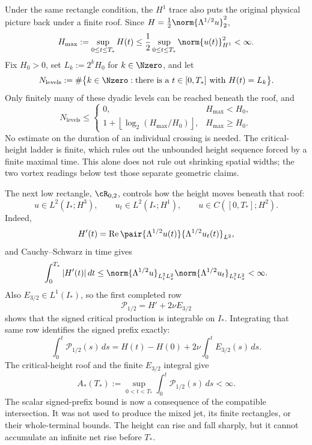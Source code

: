 Under the same rectangle condition, the \(H^1\) trace also puts the original physical
picture back under a finite roof.  Since
\(H=\tfrac12\norm{\Lambda^{1/2}u}_2^2\),
\begin{equation}\label{eq:BodyCriticalHeightRoof}
  H_{\max}
  :=\sup_{0\leq t\leq T_*}H(t)
  \leq\frac12\sup_{0\leq t\leq T_*}\norm{u(t)}_{H^1}^2
  <\infty.
\end{equation}
Fix \(H_0>0\), set \(L_k:=2^kH_0\) for \(k\in\Nzero\), and let
\[
  N_{\mathrm{levels}}
  :=
  \#\bigl\{k\in\Nzero:\text{there is a }t\in[0,T_*]\text{ with }H(t)=L_k\bigr\}.
\]
Only finitely many of these dyadic levels can be reached beneath the roof, and
\begin{equation}\label{eq:BodyFiniteZenoOctaveCount}
  N_{\mathrm{levels}}
  \leq
  \begin{cases}
    0,&H_{\max}<H_0,\\[0.25em]
    1+\left\lfloor\log_2(H_{\max}/H_0)\right\rfloor,
      &H_{\max}\geq H_0.
  \end{cases}
\end{equation}
No estimate on the duration of an individual crossing is needed.
The critical-height ladder is finite, which rules out the unbounded height sequence forced by a finite maximal time.
This alone does not rule out shrinking spatial widths; the two vortex readings below test those separate geometric claims.

The next low rectangle, \(\cR_{0,2}\), controls how the height moves beneath that
roof:
\begin{equation}\label{eq:LowRectangleZeroTwo}
  u\in L^2(I_*;H^3),
  \qquad
  u_t\in L^2(I_*;H^1),
  \qquad
  u\in C([0,T_*];H^2).
\end{equation}
Indeed,
\[
  H'(t)
  =\operatorname{Re}
  \pair{\Lambda^{1/2}u(t)}{\Lambda^{1/2}u_t(t)}_{L^2},
\]
and Cauchy--Schwarz in time gives
\begin{equation}\label{eq:CriticalHeightTotalVariationBound}
  \int_0^{T_*}|H'(t)|\,dt
  \leq
  \norm{\Lambda^{1/2}u}_{L^2_tL^2_x}
  \norm{\Lambda^{1/2}u_t}_{L^2_tL^2_x}
  <\infty.
\end{equation}
Also \(E_{3/2}\in L^1(I_*)\), so the first completed row
\[
  \mathcal P_{1/2}=H'+2\nu E_{3/2}
\]
shows that the signed critical production is integrable on \(I_*\).
Integrating that same row identifies the signed prefix exactly:
\begin{equation}\label{eq:BodySignedCriticalPrefix}
  \int_0^t\mathcal P_{1/2}(s)\,ds
  =H(t)-H(0)+2\nu\int_0^tE_{3/2}(s)\,ds.
\end{equation}
The critical-height roof and the finite \(E_{3/2}\) integral give
\begin{equation}\label{eq:BodySignedCriticalPrefixBound}
  A_*(T_*)
  :=\sup_{0<t<T_*}\int_0^t\mathcal P_{1/2}(s)\,ds
  <\infty.
\end{equation}
The scalar signed-prefix bound is now a consequence of the compatible intersection.
It was not used to produce the mixed jet, its finite rectangles, or their whole-terminal bounds.
The height can rise and fall sharply, but it cannot accumulate an infinite net rise before \(T_*\).

